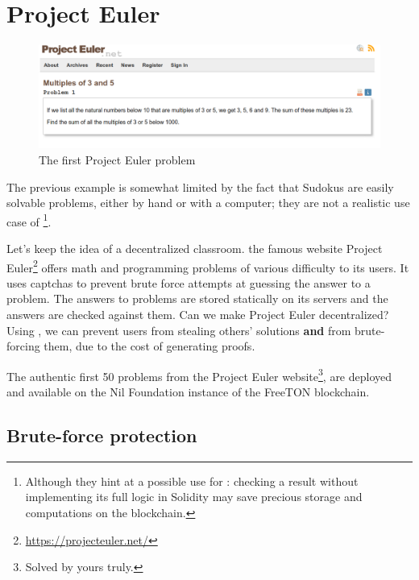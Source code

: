 \documentclass[10pt,a4paper]{article}
\begin{document}
\section{Project Euler}
\label{section_euler}

	\begin{figure}[!h]
	\centering
	\includegraphics[width=\textwidth]{euler}
	\caption{The first Project Euler problem}
\end{figure}

The previous example is somewhat limited by the fact that Sudokus are easily solvable problems, either by hand or with a computer; they are not a realistic use case of \zksnarks{}\footnote{Although they hint at a possible use for \zksnarks{}: checking a result without implementing its full logic in Solidity may save precious storage and computations on the blockchain.}.

Let's keep the idea of a decentralized classroom. the famous website Project Euler\footnote{\url{https://projecteuler.net/}} offers math and programming problems of various difficulty to its users. It uses captchas to prevent brute force attempts at guessing the answer to a problem. The answers to problems are stored statically on its servers and the answers are checked against them. Can we make Project Euler decentralized? Using \zksnarks{}, we can prevent users from stealing others' solutions \textbf{and} from brute-forcing them, due to the cost of generating proofs.

The authentic first 50 problems from the Project Euler website\footnote{Solved by yours truly.}, are deployed and available on the Nil Foundation instance of the FreeTON blockchain.

\subsection{Brute-force protection}
\label{subsec:brute-force}
\end{document}
